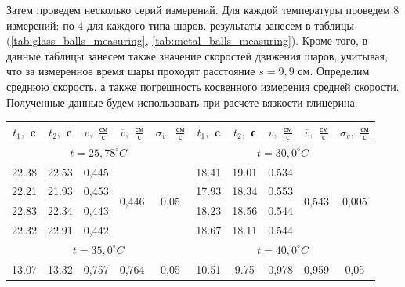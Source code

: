 \documentclass[a4paper, 12pt]{article}%
\begin{document}
Затем проведем несколько серий измерений. Для каждой температуры проведем 8 измерений: по 4 для каждого типа шаров. результаты занесем в таблицы (\ref{tab:glass_balls_measuring}, \ref{tab:metal_balls_measuring}). Кроме того, в данные таблицы занесем также значение скоростей движения шаров, учитывая, что за измеренное время шары проходят расстояние $s = 9,9 $ см. Определим среднюю скорость, а также погрешность косвенного измерения средней скорости. Полученные данные будем использовать при расчете вязкости глицерина.
\newpage
\begin{table}[h]
\centering
\begin{tabular}{|c|c|c|c|c||c|c|c|c|c|}
\hline
$t_{1},$ c     & $t_{2},$ c   & $v,$ $\frac{\text{см}}{\text{с}}$   &$ \overline{v},$ $\frac{\text{см}}{\text{с}}$                & $\sigma_{\overline{v}}, $ $\frac{\text{см}}{\text{с}}$                &   $t_{1},$ c   & $t_{2},$ с    & $v,$ $\frac{\text{см}}{\text{с}}$    &$ \overline{v},$  $\frac{\text{см}}{\text{с}}$               & $\sigma_{\overline{v}}, $  $\frac{\text{см}}{\text{с}}$       \\ \hline
\multicolumn{5}{|c|}{ $t = 25,78^\circ C$}                                              & \multicolumn{5}{c|}{$t = 30,0^\circ C$}                                             \\ \hline
22.38 & 22.53 & 0,445 & \multirow{4}{*}{0,446} & \multirow{4}{*}{0,05} & 18.41 & 19.01 & 0.534 & \multirow{4}{*}{0,543} & \multirow{4}{*}{0,005} \\ \cline{1-3} \cline{6-8}
22.21 & 21.93 & 0,453 &                       &                       & 17.93 & 18.34 & 0.553 &                       &                       \\ \cline{1-3} \cline{6-8}
22.83 & 22.34 & 0,443 &                       &                       & 18.23 & 18.56 & 0.544 &                       &                       \\ \cline{1-3} \cline{6-8}
22.32 & 22.91 & 0,442 &                       &                       & 18.67 & 18.11 & 0.544 &                       &                       \\ \hline
\multicolumn{5}{|c|}{$t = 35,0^\circ C $}                                            & \multicolumn{5}{c|}{$t = 40,0^\circ C $}                                             \\ \hline
13.07 & 13.32 & 0,757 & \multirow{4}{*}{0,764} & \multirow{4}{*}{0,05} & 10.51 & 9.75 & 0,978 & \multirow{4}{*}{0,959} & \multirow{4}{*}{0,05} \\ \cline{1-3} \cline{6-8}

\end{tabular}
\end{table}
\end{document}
